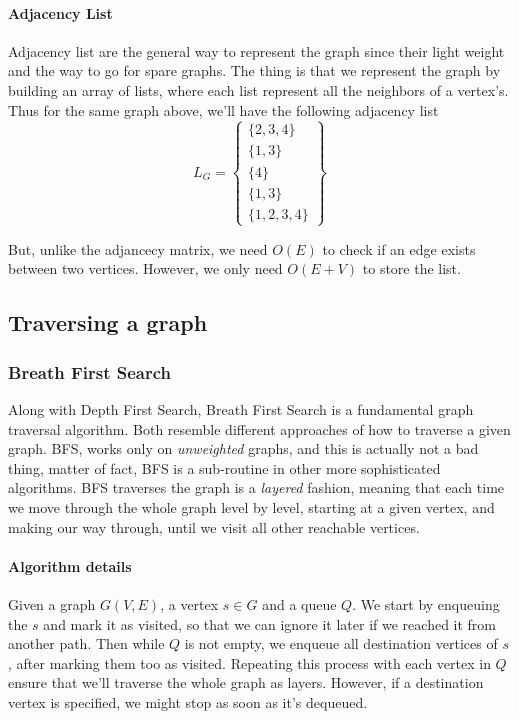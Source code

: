 \documentclass[12pt]{article}
\begin{document}
\paragraph{Adjacency List}
Adjacency list are the general way to represent the graph since their light weight and the way to go for spare graphs. The thing is that we represent the graph by building an array of lists, where each list represent all the neighbors of a vertex's. Thus for the same graph above, we'll have the following adjacency list \[
  L_G = \left\{
    \begin{matrix}
      \{2,3,4\} \\
      \{1,3\} \\
      \{4\} \\
      \{1,3\} \\
      \{1,2,3,4\}
    \end{matrix}
  \right\}
\]

But, unlike the adjancecy matrix, we need $O(E)$ to check if an edge exists between two vertices. However, we only need $O(E+V)$ to store the list.

\subsection{Traversing a graph}

\subsubsection{Breath First Search}

Along with Depth First Search, Breath First Search is a fundamental graph traversal algorithm. Both resemble different approaches of how to traverse a given graph. BFS, works only on \textit{unweighted} graphs, and this is actually not a bad thing, matter of fact, BFS is a sub-routine in other more sophisticated algorithms. BFS traverses the graph is a \textit{layered} fashion, meaning that each time we move through the whole graph level by level, starting at a given vertex, and making our way through, until we visit all other reachable vertices.



\paragraph{Algorithm details} Given a graph $G(V,E)$, a vertex $s \in G$ and a queue $Q$. We start by enqueuing the $s$ and mark it as visited, so that we can ignore it later if we reached it from another path. Then while $Q$ is not empty, we enqueue all destination vertices of $s$, after marking them too as visited. Repeating this process with each vertex in $Q$ ensure that we'll traverse the whole graph as layers. However, if a destination vertex is specified, we might stop as soon as it's dequeued.
\end{document}
